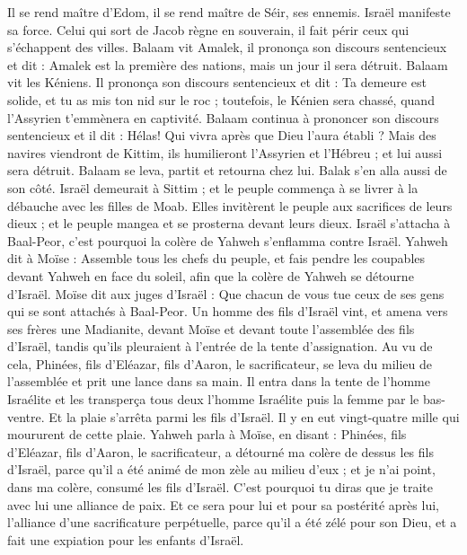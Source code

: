 \begin{multicols}{2}
Il se rend maître d’Edom, il se rend maître de Séir, ses ennemis. Israël manifeste sa force.
Celui qui sort de Jacob règne en souverain, il fait périr ceux qui s’échappent des villes.
Balaam vit Amalek, il prononça son discours sentencieux et dit : Amalek est la première des nations, mais un jour il sera détruit.
Balaam vit les Kéniens. Il prononça son discours sentencieux et dit : Ta demeure est solide, et tu as mis ton nid sur le roc ;
toutefois, le Kénien sera chassé, quand l’Assyrien t’emmènera en captivité.
Balaam continua à prononcer son discours sentencieux et il dit : Hélas! Qui vivra après que Dieu l’aura établi ?
Mais des navires viendront de Kittim, ils humilieront l’Assyrien et l’Hébreu ; et lui aussi sera détruit.
Balaam se leva, partit et retourna chez lui. Balak s'en alla aussi de son côté.
\VerseOne{}Israël demeurait à Sittim ; et le peuple commença à se livrer à la débauche avec les filles de Moab.
Elles invitèrent le peuple aux sacrifices de leurs dieux ; et le peuple mangea et se prosterna devant leurs dieux.
Israël s'attacha à Baal-Peor, c'est pourquoi la colère de Yahweh s'enflamma contre Israël.
Yahweh dit à Moïse : Assemble tous les chefs du peuple, et fais pendre les coupables devant Yahweh en face du soleil, afin que la colère de Yahweh se détourne d'Israël.
Moïse dit aux juges d'Israël : Que chacun de vous tue ceux de ses gens qui se sont attachés à Baal-Peor.
Un homme des fils d'Israël vint, et amena vers ses frères une Madianite, devant Moïse et devant toute l'assemblée des fils d'Israël, tandis qu’ils pleuraient à l’entrée de la tente d'assignation.
Au vu de cela, Phinées, fils d'Eléazar, fils d'Aaron, le sacrificateur, se leva du milieu de l'assemblée et prit une lance dans sa main.
Il entra dans la tente de l'homme Israélite et les transperça tous deux l'homme Israélite puis la femme par le bas-ventre. Et la plaie s’arrêta parmi les fils d'Israël.
Il y en eut vingt-quatre mille qui moururent de cette plaie.
Yahweh parla à Moïse, en disant :
Phinées, fils d'Eléazar, fils d'Aaron, le sacrificateur, a détourné ma colère de dessus les fils d'Israël, parce qu'il a été animé de mon zèle au milieu d'eux ; et je n'ai point, dans ma colère, consumé les fils d'Israël.
C'est pourquoi tu diras que je traite avec lui une alliance de paix.
Et ce sera pour lui et pour sa postérité après lui, l’alliance d’une sacrificature perpétuelle, parce qu’il a été zélé pour son Dieu, et a fait une expiation pour les enfants d’Israël.

\end{multicols}
